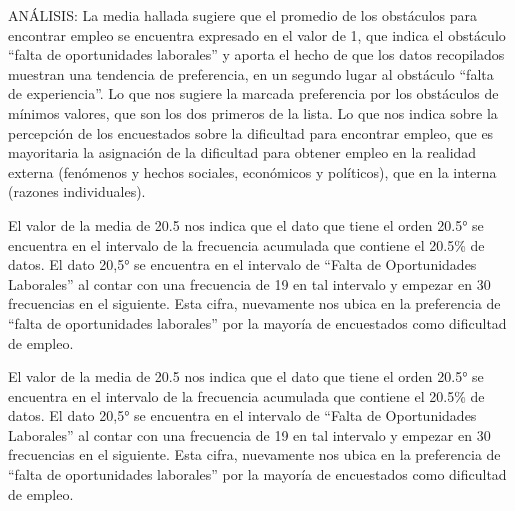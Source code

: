 \documentclass[12pt, a4paper]{article}
\begin{document}
\begin{enumerate}
\begin{figure}[H]
\begin{center}
    \end{center}
    \label{fig:obs21}
\end{figure}
ANÁLISIS:
La media hallada sugiere que el promedio de los obstáculos para encontrar empleo se encuentra expresado en el valor de 1, que indica el obstáculo “falta de oportunidades laborales” y aporta el hecho de que los datos recopilados muestran una tendencia de preferencia, en un segundo lugar al obstáculo “falta de experiencia”. Lo que nos sugiere la marcada preferencia por los obstáculos de mínimos valores, que son los dos primeros de la lista. Lo que nos indica sobre la percepción de los encuestados sobre la dificultad para encontrar empleo, que es mayoritaria la asignación de la dificultad para obtener empleo en la realidad externa (fenómenos y hechos sociales, económicos y políticos), que en la interna (razones individuales).

El valor de la media de 20.5 nos indica que el dato que tiene el orden 20.5° se encuentra en el intervalo de la frecuencia acumulada que contiene el 20.5\% de datos. El dato 20,5° se encuentra en el intervalo de “Falta de Oportunidades Laborales” al contar con una frecuencia de 19 en tal intervalo y empezar en 30 frecuencias en el siguiente. Esta cifra, nuevamente nos ubica en la preferencia de “falta de oportunidades laborales” por la mayoría de encuestados como dificultad de empleo.

El valor de la media de 20.5 nos indica que el dato que tiene el orden 20.5° se encuentra en el intervalo de la frecuencia acumulada que contiene el 20.5\% de datos. El dato 20,5° se encuentra en el intervalo de “Falta de Oportunidades Laborales” al contar con una frecuencia de 19 en tal intervalo y empezar en 30 frecuencias en el siguiente. Esta cifra, nuevamente nos ubica en la preferencia de “falta de oportunidades laborales” por la mayoría de encuestados como dificultad de empleo.


\end{enumerate}
\end{document}
